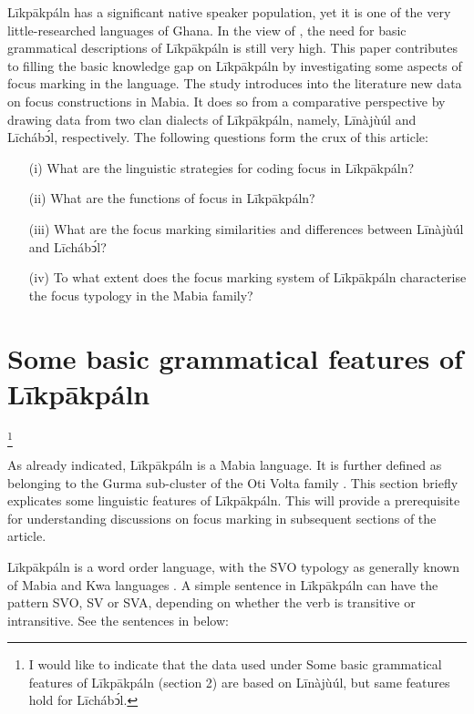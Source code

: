 \documentclass[output=paper,colorlinks,citecolor=brown]{langscibook}
\begin{document}
Līkpākpáln has a significant native speaker population, yet it is one of the very little-researched languages of Ghana. In the view of \cite{Schwarz2009}, the need for basic grammatical descriptions of Līkpākpáln is still very high. This paper contributes to filling the basic knowledge gap on Līkpākpáln by investigating some aspects of focus marking in the language. The study introduces into the literature new data on focus constructions in Mabia. It does so from a comparative perspective by drawing data from two clan dialects of Līkpākpáln, namely, Līnàjùúl and Līchábͻ́l, respectively. The following questions form the crux of this article:

\begin{itemize}
    \item[(i)]      What are the linguistic strategies for coding focus in Līkpākpáln?
    \item[(ii)]     What are the functions of focus in Līkpākpáln?
    \item[(iii)]    What are the focus marking similarities and differences between Līnàjùúl and Līchábͻ́l?
    \item[(iv)]     To what extent does the focus marking system of Līkpākpáln characterise the focus typology in the Mabia family?
\end{itemize}

\section{Some basic grammatical features of Līkpākpáln}\label{sec:bisilki:2}\footnote{I would like to indicate that the data used under Some basic grammatical features of Līkpākpáln (section 2) are based on Līnàjùúl, but same features hold for Līchábͻ́l.}

As already indicated, Līkpākpáln is a Mabia language. It is further defined as belonging to the Gurma sub-cluster of the Oti Volta family \citep{Naden1988, SteeleWeed1966}. This section briefly explicates some linguistic features of Līkpākpáln. This will provide a prerequisite for understanding discussions on focus marking in subsequent sections of the article.

Līkpākpáln is a word order language, with the SVO typology as generally known of Mabia and Kwa languages \citep{Schwarz2009}. A simple sentence in Līkpākpáln can have the pattern SVO, SV or SVA, depending on whether the verb is transitive or intransitive. See the sentences in  below:
\end{document}
